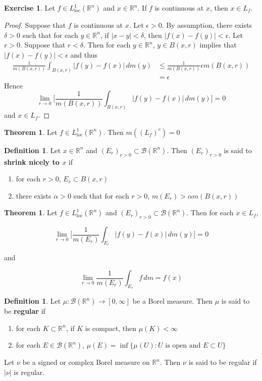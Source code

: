 \documentclass{book}
\theoremstyle{definition}
\newtheorem{defn}[definition]{Definition}
\newtheorem{thm}[definition]{Theorem}
\newtheorem{ex}[definition]{Exercise}
\newcommand{\al}{\alpha}
\newcommand{\del}{\delta}
\newcommand{\ep}{\epsilon}
\newcommand{\R}{\mathbb{R}}
\newcommand{\MB}{\mathcal{B}}
\newcommand{\lex}[1]{\label{ex:#1}}
\newcommand{\ld}[1]{\label{defn:#1}}
\DeclareMathOperator*{\0}{\mbf{0}}
\DeclareMathOperator*{\1}{\mbf{1}}
\newcommand{\RG}{[0,\infty]}
\newcommand{\dm}{\, d m}
\newcommand{\Ll}{L^1_{\text{loc}}(\R^n)}
\begin{document}
	\begin{ex} \lex{00000} 
		Let $f \in \Ll$ and $x \in \R^n$. If $f$ is continuous at $x$, then $x \in L_f$.
	\end{ex}
	
	\begin{proof}
		Suppose that $f$ is continuous at $x$. Let $\ep > 0$. By assumption, there exists $\del >0$ such that for each $y \in \R^n$, if $|x-y|< \del$, then $|f(x)-f(y)| < \ep$. Let $r >0$. Suppose that $r< \del$. Then for each $y \in \R^n$, $y \in B(x,r)$ implies that $|f(x) - f(y)| < \ep$ and thus 
		\begin{align*}
			\frac{1}{m(B(x,r))}\int_{B(x,r)}|f(y) - f(x)|\dm(y)
			& \leq \frac{1}{m(B(x,r))} \ep m(B(x,r))\\
			&=\ep
		\end{align*}
		Hence $$\lim_{r \rightarrow 0} \bigg[ \frac{1}{m(B(x,r))}\int_{B(x,r)}|f(y) - f(x)|\dm(y)\bigg] =0$$ 
		and $x \in L_f$.
	\end{proof}
	
	\begin{thm}
		Let $f \in \Ll$. Then $m((L_f)^c) = 0$
	\end{thm}
	
	\begin{defn} \ld{00000} 
		Let $x \in \R^n$ and $(E_r)_{r>0} \subset \MB(\R^n)$. Then $(E_r)_{r>0}$ is said to \textbf{shrink nicely to $x$} if 
		
		\begin{enumerate}
			\item for each $r>0$, $E_r \subset B(x,r)$
			\item there exists $\al >0$ such that for each $r>0$, $m(E_r)> \al m(B(x,r))$
		\end{enumerate} 
	\end{defn}
	
	\begin{thm}
		Let $f \in \Ll$ and $(E_r)_{r>0} \subset \MB(\R^n)$. Then for each $x \in L_f$, 
		
		$$\lim_{r \rightarrow 0} \bigg[ \frac{1}{m(E_r)}\int_{E_r}|f(y) - f(x)|\dm(y)\bigg] =0$$
		
		and 
		
		$$\lim_{r \rightarrow 0}  \frac{1}{m(E_r)}\int_{E_r}f\dm = f(x)$$
	\end{thm}
	
	\begin{defn} \ld{00000} 
		Let $\mu:\MB(\R^n) \rightarrow \RG$ be a Borel measure. Then $\mu$ is said to be \textbf{regular} if 
		\begin{enumerate}
			\item for each $K \subset \R^n$, if $K$ is compact, then $\mu(K)< \infty$
			\item for each $E \in \MB(\R^n)$, $\mu(E) = \inf \{\mu(U): U \text{ is open and }E \subset U\}$
		\end{enumerate}
		
		Let $\nu$ be a signed or complex Borel measure on $\R^n$. Then $\nu$ is said to be regular if $|\nu|$ is regular.
	\end{defn}
	
\end{document}

